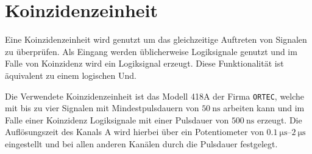 \section{Koinzidenzeinheit}

Eine Koinzidenzeinheit wird genutzt um das gleichzeitige Auftreten von Signalen zu überprüfen. Als Eingang werden üblicherweise Logiksignale genutzt und im Falle von Koinzidenz wird ein Logiksignal erzeugt. Diese Funktionalität ist äquivalent zu einem logischen Und\cite[295]{leotechniques}.

Die Verwendete Koinzidenzeinheit ist das Modell 418A der Firma \texttt{ORTEC}, welche mit bis zu vier Signalen mit Mindestpulsdauern von $\SI{50}{\nano\second}$ arbeiten kann und im Falle einer Koinzidenz Logiksignale mit einer Pulsdauer von $\SI{500}{\nano\second}$ erzeugt. Die Auflösungszeit des Kanals A wird hierbei über ein Potentiometer von $\SIrange{0.1}{2}{\micro\second}$ eingestellt und bei allen anderen Kanälen durch die Pulsdauer festgelegt\cite{coincidence_unit}.
